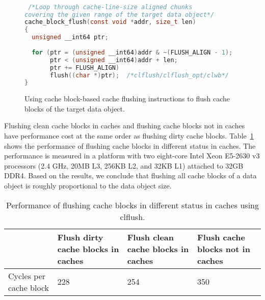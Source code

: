 \lstset{style=style1}

\begin{figure}[!htb]
\centering
\begin{lstlisting}[language=c]

 /*Loop through cache-line-size aligned chunks
covering the given range of the target data object*/
cache_block_flush(const void *addr, size_t len)
{
  unsigned __int64 ptr;
        
  for (ptr = (unsigned __int64)addr & ~(FLUSH_ALIGN - 1);
       ptr < (unsigned __int64)addr + len; 
       ptr += FLUSH_ALIGN)
       flush((char *)ptr);  /*clflush/clflush_opt/clwb*/
}
\end{lstlisting}
\vspace{-10pt}
\caption{Using cache block-based cache flushing instructions to flush cache blocks of the target data object.}
\label{fig:cache_flushing}
\vspace{-10pt}
\end{figure}

Flushing clean cache blocks in caches and flushing cache blocks not in caches have performance cost at the same order as flushing dirty cache blocks.
Table~\ref{tab:diff_clflush_perf} shows the performance of flushing cache blocks in different status in caches. The performance is measured in a platform with two eight-core Intel Xeon E5-2630 v3 processors (2.4 GHz, 20MB L3, 256KB L2, and 32KB L1) attached to 32GB DDR4. Based on the results, we conclude that flushing all cache blocks of a data object is roughly proportional to the data object size.

\begin{table}
\centering
\caption{Performance of flushing cache blocks in different status in caches using {\selectfont clflush}.}
\vspace{-10pt}
\scriptsize 
\begin{tabular}{| p{1.7cm} | p{1.7cm} | p{1.7cm} | p{1.8cm} |}
       \hline
                & \textbf{Flush dirty cache blocks in caches} & \textbf{Flush clean cache blocks in caches} & \textbf{Flush cache blocks not in caches} \\ \hline \hline
    Cycles per cache block & 228 & 254 & 350 \\ \hline
\end{tabular}
\label{tab:diff_clflush_perf}
\vspace{-10pt}
\end{table}

